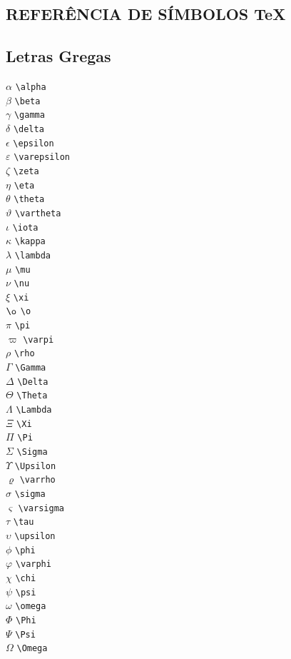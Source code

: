 \documentclass[xindy,rascunho]{fei}
\begin{document}
\begin{teorema}
	\chapter{REFERÊNCIA DE SÍMBOLOS \TeX{}}

\section{Letras Gregas}
\begin{multicols}{3}
\noindent
\(\alpha\) \verb+\alpha+\\
\(\beta\) \verb+\beta+\\
\(\gamma\) \verb+\gamma+\\
\(\delta\) \verb+\delta+\\
\(\epsilon\) \verb+\epsilon+\\
\(\varepsilon\) \verb+\varepsilon+\\
\(\zeta\) \verb+\zeta+\\
\(\eta\) \verb+\eta+\\
\(\theta\) \verb+\theta+\\
\(\vartheta\) \verb+\vartheta+\\
\(\iota\) \verb+\iota+\\
\(\kappa\) \verb+\kappa+\\
\(\lambda\) \verb+\lambda+\\
\(\mu\) \verb+\mu+\\
\(\nu\) \verb+\nu+\\
\(\xi\) \verb+\xi+\\
\(\o\) \verb+\o+\\
\(\pi\) \verb+\pi+\\
\(\varpi\) \verb+\varpi+\\
\(\rho\) \verb+\rho+\\
\(\Gamma\) \verb+\Gamma+\\
\(\Delta\) \verb+\Delta+\\
\(\Theta\) \verb+\Theta+\\
\(\Lambda\) \verb+\Lambda+\\
\(\Xi\) \verb+\Xi+\\
\(\Pi\) \verb+\Pi+\\
\(\Sigma\) \verb+\Sigma+\\
\(\Upsilon\) \verb+\Upsilon+\\
\(\varrho\) \verb+\varrho+\\
\(\sigma\) \verb+\sigma+\\
\(\varsigma\) \verb+\varsigma+\\
\(\tau\) \verb+\tau+\\
\(\upsilon\) \verb+\upsilon+\\
\(\phi\) \verb+\phi+\\
\(\varphi\) \verb+\varphi+\\
\(\chi\) \verb+\chi+\\
\(\psi\) \verb+\psi+\\
\(\omega\) \verb+\omega+\\
\(\Phi\) \verb+\Phi+\\
\(\Psi\) \verb+\Psi+\\
\(\Omega\) \verb+\Omega+\\
\end{multicols}


\end{teorema}
\end{document}
